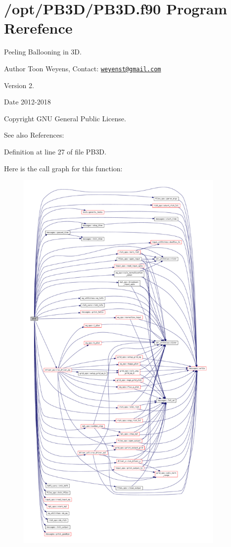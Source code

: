 \hypertarget{PB3D_8f90}{}\section{/opt/\+P\+B3\+D/\+P\+B3D.f90 Program Rerefence}
\label{PB3D_8f90}



Peeling Ballooning in 3D. 

\begin{DoxyAuthor}{Author}
Toon Weyens, Contact\+: \href{mailto:weyenst@gmail.com}{\tt weyenst@gmail.\+com} 
\end{DoxyAuthor}
\begin{DoxyVersion}{Version}
2. 
\end{DoxyVersion}
\begin{DoxyDate}{Date}
2012-\/2018 
\end{DoxyDate}
\begin{DoxyCopyright}{Copyright}
G\+NU General Public License. 
\end{DoxyCopyright}
\begin{DoxySeeAlso}{See also}
References\+: \cite{weyens2014theory} \cite{Weyens2017PB3D} 
\end{DoxySeeAlso}


Definition at line 27 of file P\+B3\+D.

Here is the call graph for this function\+:\nopagebreak
\begin{figure}[H]
\begin{center}
\leavevmode
\includegraphics[height=550pt]{PB3D_8f90_afaee01f014ab3398eecac996b2795fd2_cgraph}
\end{center}
\end{figure}
